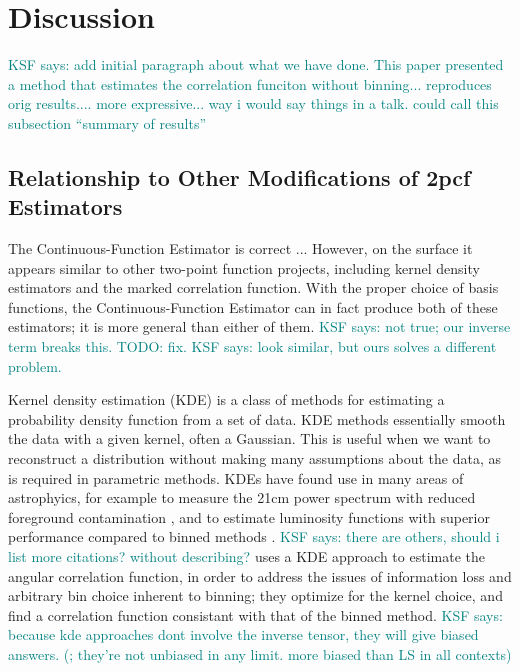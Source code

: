 \documentclass[modern]{aastex62}
\newcommand{\cf}{2pcf\xspace} %
\newcommand{\Est}{The Continuous-Function Estimator\xspace}
\newcommand{\est}{the Continuous-Function Estimator\xspace}
\newcommand{\KSF}[1]{\textcolor{teal}{KSF says: #1}}
\begin{document}
\section{Discussion} \label{sec:discuss}

\KSF{add initial paragraph about what we have done. This paper presented a method that estimates the correlation funciton without binning... reproduces orig results.... more expressive... way i would say things in a talk. could call this subsection ``summary of results''}

\subsection{Relationship to Other Modifications of \cf Estimators}
\label{sec:otherest}

\Est is correct ...  
However, on the surface it appears similar to other two-point function projects, including kernel density estimators and the marked correlation function.
With the proper choice of basis functions, \est can in fact produce both of these estimators; it is more general than either of them. \KSF{not true; our inverse term breaks this. TODO: fix.}
\KSF{look similar, but ours solves a different problem.}

Kernel density estimation (KDE) is a class of methods for estimating a probability density function from a set of data.
KDE methods essentially smooth the data with a given kernel, often a Gaussian.
This is useful when we want to reconstruct a distribution without making many assumptions about the data, as is required in parametric methods.
KDEs have found use in many areas of astrophyics, for example to measure the 21cm power spectrum with reduced foreground contamination \citep{Trott2019}, and to estimate luminosity functions with superior performance compared to binned methods \citep{Yuan2020}.
\KSF{there are others, should i list more citations? without describing?}
\cite{Hatfield2016} uses a KDE approach to estimate the angular correlation function, in order to address the issues of information loss and arbitrary bin choice inherent to binning; they optimize for the kernel choice, and find a correlation function consistant with that of the binned method.
\KSF{because kde approaches dont involve the inverse tensor, they will give biased answers. (; they're not unbiased in any limit. more biased than LS in all contexts)}
\end{document}

